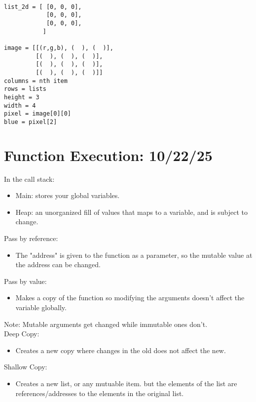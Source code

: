 \documentclass[11pt]{article}
\begin{document}
\begin{verbatim}

list_2d = [ [0, 0, 0],
            [0, 0, 0],
            [0, 0, 0],
           ]

image = [[(r,g,b), (  ), (  )],
         [(  ), (  ), (  )],
         [(  ), (  ), (  )],
         [(  ), (  ), (  )]]
columns = nth item
rows = lists
height = 3
width = 4
pixel = image[0][0]
blue = pixel[2]

\end{verbatim}

\section{Function Execution: 10/22/25}
In the call stack:
\begin{itemize}
    \item Main: stores your global variables.
    \item Heap: an unorganized fill of values that maps to a variable, and is subject to change.
\end{itemize}
Pass by reference:
\begin{itemize}
    \item The "address" is given to the function as a parameter, so the mutable value at the address can be changed.
\end{itemize}
Pass by value:
\begin{itemize}
    \item Makes a copy of the function so modifying the arguments doesn't affect the variable globally.
\end{itemize}
Note: Mutable arguments get changed while immutable ones don't. \\
Deep Copy:
\begin{itemize}
    \item Creates a new copy where changes in the old does not affect the new.
\end{itemize}
Shallow Copy:
\begin{itemize}
    \item Creates a new list, or any mutuable item. but the elements of the list are references/addresses to the elements in the original list.
\end{itemize}
\end{document}
